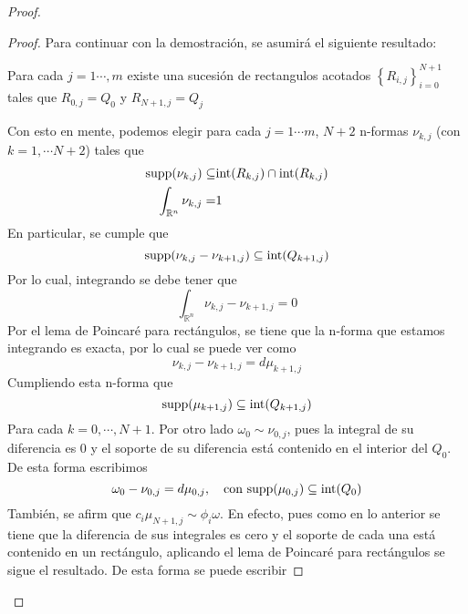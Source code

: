\documentclass[12pt]{report}
\theoremstyle{largebreak}
\begin{document}
\begin{proof}
\begin{proof}
            Para continuar con la demostración, se asumirá el siguiente resultado:
            \begin{lema}
                Para cada $j=1\cdots,m$ existe una sucesión de rectangulos acotados $\left\{R_{i,j}\right\}_{i=0}^{N+1}$ tales que $R_{0,j}=Q_0$ y $R_{N+1,j}=Q_j$
            \end{lema}
            Con esto en mente, podemos elegir para cada $j=1\cdots m$, $N+2$ n-formas $\nu_{k,j}$ (con $k=1,\cdots N+2$) tales que
            \begin{equation*}
                \begin{split}
                    \textup{supp}(\nu_{k,j})\subseteq& \textup{int}(R_{k,j})\cap\textup{int}(R_{k,j})\\
                    \int_{\mathbb{R}^n}\nu_{k,j}=&1
                \end{split}
            \end{equation*}
            En particular, se cumple que 
            \begin{equation*}
                \textup{supp}(\nu_{k,j}-\nu_{k+1,j})\subseteq\textup{int}(Q_{k+1,j})
            \end{equation*}
            Por lo cual, integrando se debe tener que
            \begin{equation*}
                \int_{\mathbb{R}^n}\nu_{k,j}-\nu_{k+1,j}=0
            \end{equation*}
            Por el lema de Poincaré para rectángulos, se tiene que la n-forma que estamos integrando es exacta, por lo cual se puede ver como
            \begin{equation*}
                \nu_{k,j}-\nu_{k+1,j}=d\mu_{k+1,j}
            \end{equation*}
            Cumpliendo esta n-forma que
            \begin{equation*}
                \textup{supp}(\mu_{k+1,j})\subseteq \textup{int}(Q_{k+1,j})
            \end{equation*}
            Para cada $k=0,\cdots, N+1$. Por otro lado $\omega_0 \sim \nu_{0,j}$, pues la integral de su diferencia es 0 y el soporte de su diferencia está contenido en el interior del $Q_0$. De esta forma escribimos
            \begin{equation*}
                \omega_0-\nu_{0,j}=d\mu_{0,j},\quad \textup{con supp}(\mu_{0,j})\subseteq\textup{int}(Q_0)
            \end{equation*}
            También, se afirm que $c_i\mu_{N+1,j}\sim\phi_i\omega$. En efecto, pues como en lo anterior se tiene que la diferencia de sus integrales es cero y el soporte de cada una está contenido en un rectángulo, aplicando el lema de Poincaré para rectángulos se sigue el resultado. De esta forma se puede escribir

\end{proof}
\end{proof}
\end{document}
